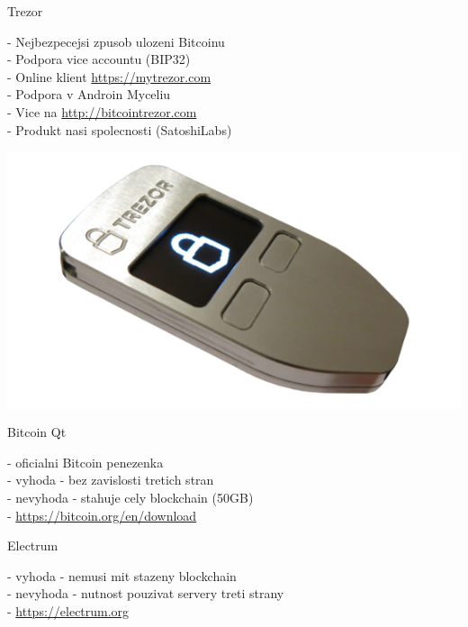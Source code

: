 \documentclass{beamer}
\begin{document}
\begin{frame}

    {\LARGE Trezor}\\

    \vspace{5mm}

    - Nejbezpecejsi zpusob ulozeni Bitcoinu\\
    - Podpora vice accountu (BIP32)\\
    - Online klient \url{https://mytrezor.com}\\
    - Podpora v Androin Myceliu\\
    - Vice na \url{http://bitcointrezor.com}\\
    - Produkt nasi spolecnosti (SatoshiLabs)\\

    \vspace{5mm}

    \includegraphics[scale=0.3]{img/trezor}

\end{frame}

\begin{frame}

    {\LARGE Bitcoin Qt}\\

    \vspace{5mm}

    - oficialni Bitcoin penezenka\\
    - vyhoda - bez zavislosti tretich stran\\
    - nevyhoda - stahuje cely blockchain (50GB)\\
    - \url{https://bitcoin.org/en/download}

    \vspace{10mm}

    {\LARGE Electrum}\\

    \vspace{5mm}

    - vyhoda - nemusi mit stazeny blockchain\\
    - nevyhoda - nutnost pouzivat servery treti strany\\
    - \url{https://electrum.org}

\end{frame}
\end{document}
